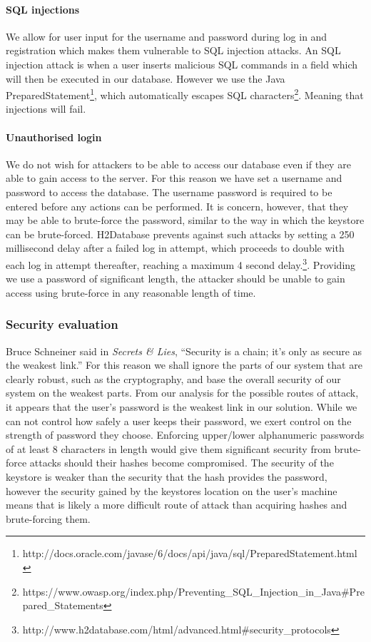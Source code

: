 \documentclass[12pt, titlepage]{article}
\begin{document}
\paragraph*{SQL injections} We allow for user input for the username and password during log in and registration which makes them vulnerable to SQL injection attacks. An SQL injection attack is when a user inserts malicious SQL commands in a field which will then be executed in our database. However we use the Java PreparedStatement\footnote{http://docs.oracle.com/javase/6/docs/api/java/sql/PreparedStatement.html}, which automatically escapes SQL characters\footnote{https://www.owasp.org/index.php/Preventing\_SQL\_Injection\_in\_Java\#Prepared\_Statements}. Meaning that injections will fail. 

\paragraph*{Unauthorised login} We do not wish for attackers to be able to access our database even if they are able to gain access to the server. For this reason we have set a username and password to access the database. The username password is required to be entered before any actions can be performed. It is concern, however, that they may be able to brute-force the password, similar to the way in which the keystore can be brute-forced. H2Database prevents against such attacks by setting a 250 millisecond delay after a failed log in attempt, which proceeds to double with each log in attempt thereafter, reaching a maximum 4 second delay.\footnote{http://www.h2database.com/html/advanced.html\#security\_protocols}. Providing we use a password of significant length, the attacker should be unable to gain access using brute-force in any reasonable length of time.

\subsubsection*{Security evaluation}
Bruce Schneiner said in \textit{Secrets \& Lies}, ``Security is a chain; it's only as secure as the weakest link.'' For this reason we shall ignore the parts of our system that are clearly robust, such as the cryptography, and base the overall security of our system on the weakest parts.
\newline \indent From our analysis for the possible routes of attack, it appears that the user's password is the weakest link in our solution. While we can not control how safely a user keeps their password, we exert control on the strength of password they choose. Enforcing upper/lower alphanumeric passwords of at least 8 characters in length would give them significant security from brute-force attacks should their hashes become compromised.
\newline \indent The security of the keystore is weaker than the security that the hash provides the password, however the security gained by the keystores location on the user's machine means that is likely a more difficult route of attack than acquiring hashes and brute-forcing them.
\end{document}
